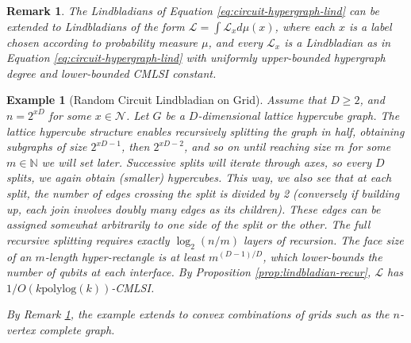 \documentclass[11pt,reqno]{amsart}
\newtheorem{rem}[lemma]{Remark}
\newtheorem{exam}[lemma]{Example}
\newcommand{\NN}{\mathbb{N}}
\renewcommand{\L}{\mathcal{L}}
\newcommand{\N}{\mathcal{N}}
\begin{document}
\begin{rem} \normalfont \label{rem:convex-graph}
    The Lindbladians of Equation \eqref{eq:circuit-hypergraph-lind} can be extended to Lindbladians of the form $\L = \int \L_x d \mu(x)$, where each $x$ is a label chosen according to probability measure $\mu$, and every $\L_x$ is a Lindbladian as in Equation \eqref{eq:circuit-hypergraph-lind} with uniformly upper-bounded hypergraph degree and lower-bounded CMLSI constant.
\end{rem}

\begin{exam}[Random Circuit Lindbladian on Grid] \normalfont \label{exam:grid}
Assume that $D \geq 2$, and $n = 2^{x D}$ for some $x \in \N$. Let $G$ be a $D$-dimensional lattice hypercube graph. The lattice hypercube structure enables recursively splitting the graph in half, obtaining subgraphs of size $2^{x D - 1}$, then $2^{x D - 2}$, and so on until reaching size $m$ for some $m \in \NN$ we will set later. Successive splits will iterate through axes, so every $D$ splits, we again obtain (smaller) hypercubes. This way, we also see that at each split, the number of edges crossing the split is divided by 2 (conversely if building up, each join involves doubly many edges as its children). These edges can be assigned somewhat arbitrarily to one side of the split or the other. The full recursive splitting requires exactly $\log_2 (n/m)$ layers of recursion. The face size of an $m$-length hyper-rectangle is at least $m^{(D-1)/D}$, which lower-bounds the number of qubits at each interface. By Proposition \ref{prop:lindbladian-recur}, $\L$ has $1/O(k \mathrm{polylog}(k))$-CMLSI.

By Remark \ref{rem:convex-graph}, the example extends to convex combinations of grids such as the $n$-vertex complete graph.
\end{exam}
\end{document}
